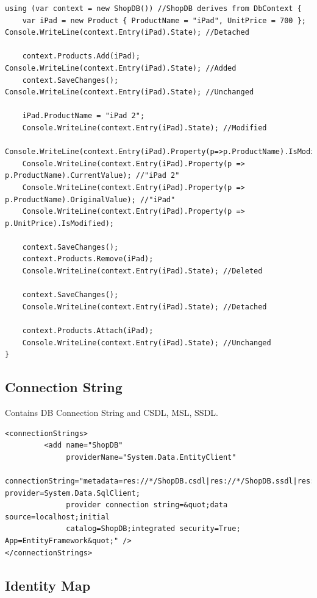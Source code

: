 \documentclass[
a4paper,
oneside,
10pt,
fleqn,
headsepline,
toc=listofnumbered, 
bibliography=totocnumbered]{scrartcl}
\begin{document}
\begin{lstlisting}
using (var context = new ShopDB()) //ShopDB derives from DbContext {
    var iPad = new Product { ProductName = "iPad", UnitPrice = 700 }; Console.WriteLine(context.Entry(iPad).State); //Detached
    
    context.Products.Add(iPad); Console.WriteLine(context.Entry(iPad).State); //Added
    context.SaveChanges(); Console.WriteLine(context.Entry(iPad).State); //Unchanged
    
    iPad.ProductName = "iPad 2";
    Console.WriteLine(context.Entry(iPad).State); //Modified
    Console.WriteLine(context.Entry(iPad).Property(p=>p.ProductName).IsModified); 
    Console.WriteLine(context.Entry(iPad).Property(p => p.ProductName).CurrentValue); //"iPad 2" 
    Console.WriteLine(context.Entry(iPad).Property(p => p.ProductName).OriginalValue); //"iPad"
    Console.WriteLine(context.Entry(iPad).Property(p => p.UnitPrice).IsModified);
    
    context.SaveChanges();
    context.Products.Remove(iPad);
    Console.WriteLine(context.Entry(iPad).State); //Deleted
    
    context.SaveChanges();
    Console.WriteLine(context.Entry(iPad).State); //Detached
    
    context.Products.Attach(iPad);
    Console.WriteLine(context.Entry(iPad).State); //Unchanged 
}
\end{lstlisting}

\subsection{Connection String}

Contains DB Connection String and CSDL, MSL, SSDL.

\begin{lstlisting}
<connectionStrings>
         <add name="ShopDB"
              providerName="System.Data.EntityClient"
              connectionString="metadata=res://*/ShopDB.csdl|res://*/ShopDB.ssdl|res://*/ShopDB.msl; provider=System.Data.SqlClient;
              provider connection string=&quot;data source=localhost;initial
              catalog=ShopDB;integrated security=True; App=EntityFramework&quot;" /> 
</connectionStrings>
\end{lstlisting}

\subsection{Identity Map}
\end{document}
